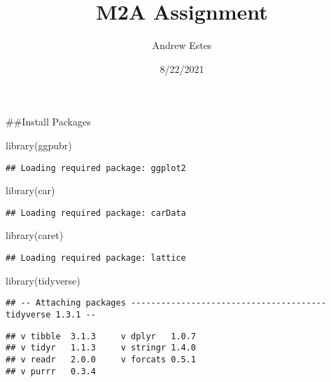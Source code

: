 \documentclass[
]{article}
\title{M2A Assignment}
\author{Andrew Estes}
\date{8/22/2021}
\newenvironment{Shaded}{\begin{snugshade}}{\end{snugshade}}
\newcommand{\FunctionTok}[1]{\textcolor[rgb]{0.00,0.00,0.00}{#1}}
\newcommand{\NormalTok}[1]{#1}
\begin{document}
\maketitle

\#\#Install Packages

\begin{Shaded}
\begin{Highlighting}[]
\FunctionTok{library}\NormalTok{(ggpubr)}
\end{Highlighting}
\end{Shaded}

\begin{verbatim}
## Loading required package: ggplot2
\end{verbatim}

\begin{Shaded}
\begin{Highlighting}[]
\FunctionTok{library}\NormalTok{(car)}
\end{Highlighting}
\end{Shaded}

\begin{verbatim}
## Loading required package: carData
\end{verbatim}

\begin{Shaded}
\begin{Highlighting}[]
\FunctionTok{library}\NormalTok{(caret)}
\end{Highlighting}
\end{Shaded}

\begin{verbatim}
## Loading required package: lattice
\end{verbatim}

\begin{Shaded}
\begin{Highlighting}[]
\FunctionTok{library}\NormalTok{(tidyverse)}
\end{Highlighting}
\end{Shaded}

\begin{verbatim}
## -- Attaching packages --------------------------------------- tidyverse 1.3.1 --
\end{verbatim}

\begin{verbatim}
## v tibble  3.1.3     v dplyr   1.0.7
## v tidyr   1.1.3     v stringr 1.4.0
## v readr   2.0.0     v forcats 0.5.1
## v purrr   0.3.4
\end{verbatim}
\end{document}
